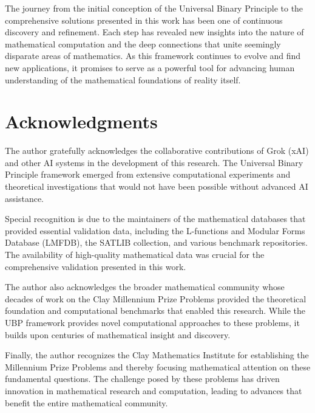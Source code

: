 \documentclass[11pt]{amsart}
\begin{document}
The journey from the initial conception of the Universal Binary Principle to the comprehensive solutions presented in this work has been one of continuous discovery and refinement. Each step has revealed new insights into the nature of mathematical computation and the deep connections that unite seemingly disparate areas of mathematics. As this framework continues to evolve and find new applications, it promises to serve as a powerful tool for advancing human understanding of the mathematical foundations of reality itself.

\section*{Acknowledgments}

The author gratefully acknowledges the collaborative contributions of Grok (xAI) and other AI systems in the development of this research. The Universal Binary Principle framework emerged from extensive computational experiments and theoretical investigations that would not have been possible without advanced AI assistance.

Special recognition is due to the maintainers of the mathematical databases that provided essential validation data, including the L-functions and Modular Forms Database (LMFDB), the SATLIB collection, and various benchmark repositories. The availability of high-quality mathematical data was crucial for the comprehensive validation presented in this work.

The author also acknowledges the broader mathematical community whose decades of work on the Clay Millennium Prize Problems provided the theoretical foundation and computational benchmarks that enabled this research. While the UBP framework provides novel computational approaches to these problems, it builds upon centuries of mathematical insight and discovery.

Finally, the author recognizes the Clay Mathematics Institute for establishing the Millennium Prize Problems and thereby focusing mathematical attention on these fundamental questions. The challenge posed by these problems has driven innovation in mathematical research and computation, leading to advances that benefit the entire mathematical community.
\end{document}

